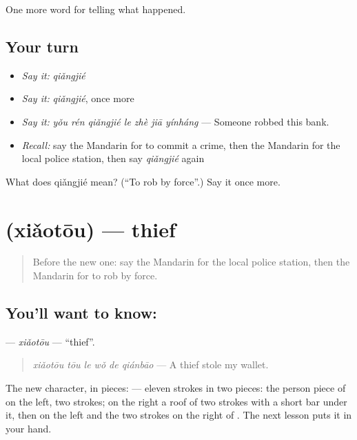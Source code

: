 \begin{grammarlens}[title={What you've built}]
One more word for telling what happened.
\end{grammarlens}

\subsection*{Your turn}
\begin{itemize}
\raggedright
  \item \emph{Say it:} \emph{qiǎngjié}
  \item \emph{Say it:} \emph{qiǎngjié}, once more
  \item \emph{Say it:} \emph{yǒu rén qiǎngjié le zhè jiā yínháng} — Someone robbed this bank.
  \item \emph{Recall:} say the Mandarin for to commit a crime, then the Mandarin for the local police station, then say \emph{qiǎngjié} again
\end{itemize}

\begin{tcolorbox}[breakable,colback=teal!4,colframe=teal!35!black,title={Before you move on}]
What does qiǎngjié mean? (\textquotedblleft{}To rob by force\textquotedblright{}.) Say it once more.
\end{tcolorbox}
\section[\texorpdfstring{\zh{小偷} (xiǎotōu)}{小偷 (xiǎotōu)}]{ (xiǎotōu) — thief}

\label{lesson:ZH-C309-xiaotou}



\begin{quote}
Before the new one: say the Mandarin for the local police station, then the Mandarin for to rob by force.
\end{quote}

\subsection*{You'll want to know: }
\textbf{} — \emph{xiǎotōu} — \textquotedblleft{}thief\textquotedblright{}.

\begin{quote}
\textbf{} \emph{xiǎotōu tōu le wǒ de qiánbāo} — A thief stole my wallet.
\end{quote}

The new character, in pieces:  — eleven strokes in two pieces: the person piece of  on the left, two strokes; on the right a roof of two strokes with a short bar under it, then  on the left and the two strokes on the right of . The next lesson puts it in your hand.

